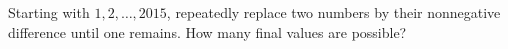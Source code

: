 Starting with $1,2,\ldots,2015$, repeatedly replace two numbers by their nonnegative difference until one remains. How many final values are possible?
